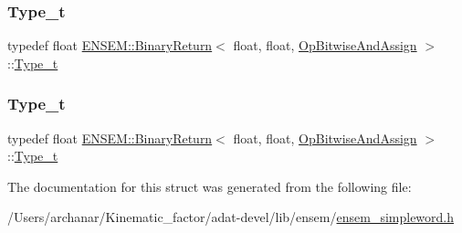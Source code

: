 \mbox{\label{structENSEM_1_1BinaryReturn_3_01float_00_01float_00_01OpBitwiseAndAssign_01_4_ad1e9a8f181e2615bea9ad008a77badf5}} 
\subsubsection{\texorpdfstring{Type\_t}{Type\_t}\hspace{0.1cm}{\footnotesize\ttfamily [2/3]}}
{\footnotesize\ttfamily typedef float \mbox{\hyperlink{structENSEM_1_1BinaryReturn}{E\+N\+S\+E\+M\+::\+Binary\+Return}}$<$ float, float, \mbox{\hyperlink{structENSEM_1_1OpBitwiseAndAssign}{Op\+Bitwise\+And\+Assign}} $>$\+::\mbox{\hyperlink{structENSEM_1_1BinaryReturn_3_01float_00_01float_00_01OpBitwiseAndAssign_01_4_ad1e9a8f181e2615bea9ad008a77badf5}{Type\+\_\+t}}}

\mbox{\label{structENSEM_1_1BinaryReturn_3_01float_00_01float_00_01OpBitwiseAndAssign_01_4_ad1e9a8f181e2615bea9ad008a77badf5}} 
\subsubsection{\texorpdfstring{Type\_t}{Type\_t}\hspace{0.1cm}{\footnotesize\ttfamily [3/3]}}
{\footnotesize\ttfamily typedef float \mbox{\hyperlink{structENSEM_1_1BinaryReturn}{E\+N\+S\+E\+M\+::\+Binary\+Return}}$<$ float, float, \mbox{\hyperlink{structENSEM_1_1OpBitwiseAndAssign}{Op\+Bitwise\+And\+Assign}} $>$\+::\mbox{\hyperlink{structENSEM_1_1BinaryReturn_3_01float_00_01float_00_01OpBitwiseAndAssign_01_4_ad1e9a8f181e2615bea9ad008a77badf5}{Type\+\_\+t}}}



The documentation for this struct was generated from the following file\+:\begin{DoxyCompactItemize}
\item 
/\+Users/archanar/\+Kinematic\+\_\+factor/adat-\/devel/lib/ensem/\mbox{\hyperlink{adat-devel_2lib_2ensem_2ensem__simpleword_8h}{ensem\+\_\+simpleword.\+h}}\end{DoxyCompactItemize}
